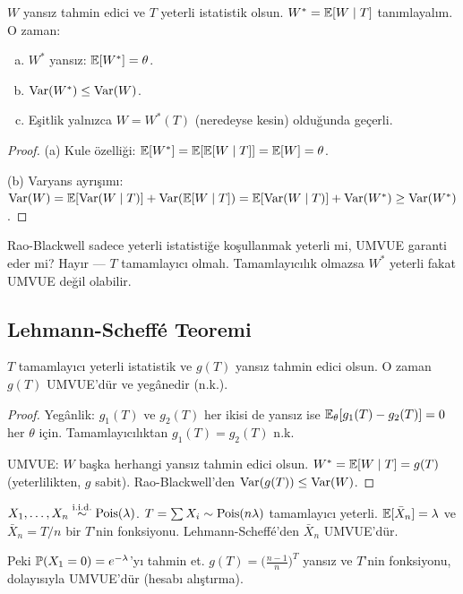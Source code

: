 \begin{teorem}\label{thm:rao_blackwell}
$W$ yansız tahmin edici ve $T$ yeterli istatistik olsun. $W^* = \mathbb{E}[W\mid T]$ tanımlayalım. O zaman:
\begin{enumerate}[(a)]
  \item $W^*$ yansız: $\mathbb{E}[W^*] = \theta$.
  \item $\operatorname{Var}(W^*)\leq\operatorname{Var}(W)$.
  \item Eşitlik yalnızca $W = W^*(T)$ (neredeyse kesin) olduğunda geçerli.
\end{enumerate}
\end{teorem}

\begin{proof}
(a) Kule özelliği: $\mathbb{E}[W^*] = \mathbb{E}[\mathbb{E}[W\mid T]] = \mathbb{E}[W] = \theta$.

(b) Varyans ayrışımı: $\operatorname{Var}(W) = \mathbb{E}[\operatorname{Var}(W\mid T)] + \operatorname{Var}(\mathbb{E}[W\mid T]) = \mathbb{E}[\operatorname{Var}(W\mid T)] + \operatorname{Var}(W^*) \geq \operatorname{Var}(W^*)$.
\end{proof}

\begin{kritiksorgu}
Rao-Blackwell sadece yeterli istatistiğe koşullanmak yeterli mi, UMVUE garanti eder mi? Hayır --- $T$ tamamlayıcı olmalı. Tamamlayıcılık olmazsa $W^*$ yeterli fakat UMVUE değil olabilir.
\end{kritiksorgu}

\subsection{Lehmann-Scheffé Teoremi}

\begin{teorem}\label{thm:lehmann_scheffe}
$T$ tamamlayıcı yeterli istatistik ve $g(T)$ yansız tahmin edici olsun. O zaman $g(T)$ UMVUE'dür ve yegânedir (n.k.).
\end{teorem}

\begin{proof}
Yegânlik: $g_1(T)$ ve $g_2(T)$ her ikisi de yansız ise $\mathbb{E}_\theta[g_1(T)-g_2(T)]=0$ her $\theta$ için. Tamamlayıcılıktan $g_1(T)=g_2(T)$ n.k.

UMVUE: $W$ başka herhangi yansız tahmin edici olsun. $W^* = \mathbb{E}[W\mid T] = g(T)$ (yeterlilikten, $g$ sabit). Rao-Blackwell'den $\operatorname{Var}(g(T)) \leq \operatorname{Var}(W)$.
\end{proof}

\begin{ornek}\label{ex:poisson_umvue}
$X_1,\ldots,X_n\overset{\text{i.i.d.}}{\sim}\operatorname{Pois}(\lambda)$. $T=\sum X_i \sim \operatorname{Pois}(n\lambda)$ tamamlayıcı yeterli. $\mathbb{E}[\bar{X}_n]=\lambda$ ve $\bar{X}_n = T/n$ bir $T$'nin fonksiyonu. Lehmann-Scheffé'den $\bar{X}_n$ UMVUE'dür.

Peki $\mathbb{P}(X_1=0)=e^{-\lambda}$'yı tahmin et. $g(T)=\bigl(\frac{n-1}{n}\bigr)^T$ yansız ve $T$'nin fonksiyonu, dolayısıyla UMVUE'dür (hesabı alıştırma).
\end{ornek}

